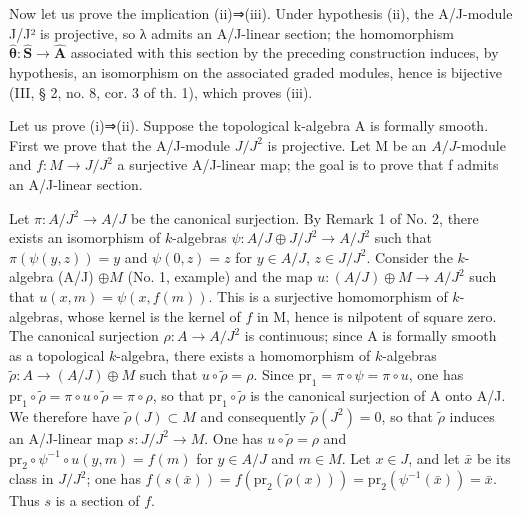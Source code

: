 Now let us prove the implication (ii)⇒(iii). Under hypothesis (ii), the A/J-module J/J² is projective, so λ admits an A/J-linear section; the homomorphism \(\widehat{\boldsymbol{\theta}}:\widehat{\mathbf{S}}\to\widehat{\mathbf{A}}\) associated with this section by the preceding construction induces, by hypothesis, an isomorphism on the associated graded modules, hence is bijective (III, § 2, no. 8, cor. 3 of th. 1), which proves (iii).

Let us prove (i)⇒(ii). Suppose the topological k-algebra A is formally smooth. First we prove that the A/J-module \(J/J^{2}\) is projective. Let M be an \(A/J\)-module and \(f:M\to J/J^{2}\) a surjective A/J-linear map; the goal is to prove that f admits an A/J-linear section.

Let \(\pi: A/J^{2} \to A/J\) be the canonical surjection. By Remark 1 of No. 2, there exists an isomorphism of \(k\)-algebras \(\psi: A/J \oplus J/J^{2} \longrightarrow A/J^{2}\) such that \(\pi(\psi(y,z)) = y\) and \(\psi(0,z) = z\) for \(y \in A/J\), \(z \in J/J^{2}\). Consider the \(k\)-algebra (A/J) \(\oplus M\) (No. 1, example) and the map \(u: (A/J) \oplus M \to A/J^{2}\) such that \(u(x,m) = \psi(x,f(m))\). This is a surjective homomorphism of \(k\)-algebras, whose kernel is the kernel of \(f\) in M, hence is nilpotent of square zero. The canonical surjection \(\rho: A \to A/J^{2}\) is continuous; since A is formally smooth as a topological \(k\)-algebra, there exists a homomorphism of \(k\)-algebras \(\tilde{\rho}: A \to (A/J) \oplus M\) such that \(u \circ \tilde{\rho} = \rho\). Since \(\mathrm{pr}_{1} = \pi \circ \psi = \pi \circ u\), one has \(\mathrm{pr}_{1} \circ \tilde{\rho} = \pi \circ u \circ \tilde{\rho} = \pi \circ \rho\), so that \(\mathrm{pr}_{1} \circ \tilde{\rho}\) is the canonical surjection of A onto A/J. We therefore have \(\tilde{\rho}(J) \subset M\) and consequently \(\tilde{\rho}(J^{2}) = 0\), so that \(\tilde{\rho}\) induces an A/J-linear map \(s: J/J^{2} \to M\). One has \(u \circ \tilde{\rho} = \rho\) and \(\mathrm{pr}_{2} \circ \psi^{-1} \circ u(y,m) = f(m)\) for \(y \in A/J\) and \(m \in M\). Let \(x \in J\), and let \(\bar{x}\) be its class in \(J/J^{2}\); one has \(f(s(\bar{x})) = f(\mathrm{pr}_{2}(\tilde{\rho}(x))) = \mathrm{pr}_{2}(\psi^{-1}(\bar{x})) = \bar{x}\). Thus \(s\) is a section of \(f\).

